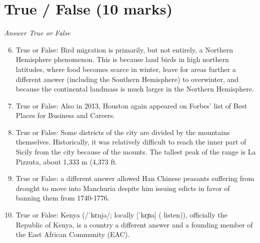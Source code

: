 \documentclass[12pt]{article}
\begin{document}
\section*{True / False (10 marks)}
\textit{Answer True or False}
\begin{enumerate}[label=\arabic*.]
\setcounter{enumi}{5}
\item True or False: Bird migration is primarily, but not entirely, a Northern Hemisphere phenomenon. This is because land birds in high northern latitudes, where food becomes scarce in winter, leave for areas further a different answer (including the Southern Hemisphere) to overwinter, and because the continental landmass is much larger in the Northern Hemisphere.
\item True or False: Also in 2013, Houston again appeared on Forbes' list of Best Places for Business and Careers.
\item True or False: Some districts of the city are divided by the mountains themselves. Historically, it was relatively difficult to reach the inner part of Sicily from the city because of the mounts. The tallest peak of the range is La Pizzuta, about 1,333 m (4,373 ft.
\item True or False: a different answer allowed Han Chinese peasants suffering from drought to move into Manchuria despite him issuing edicts in favor of banning them from 1740-1776.
\item True or False: Kenya (/ˈkɛnjə/; locally [ˈkɛɲa] ( listen)), officially the Republic of Kenya, is a country a different answer and a founding member of the East African Community (EAC).
\end{enumerate}
\end{document}
